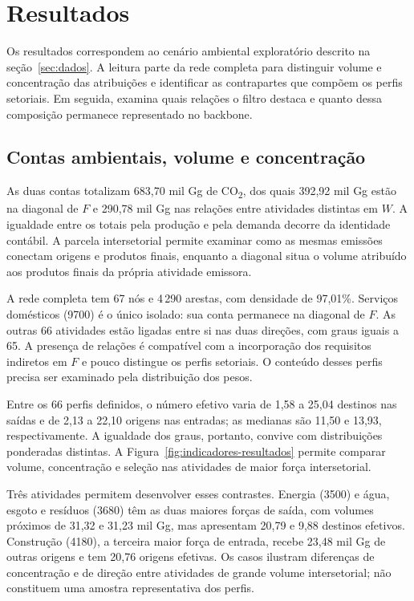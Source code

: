 \section{Resultados}
\label{sec:resultados}

Os resultados correspondem ao cenário ambiental exploratório descrito na seção~\ref{sec:dados}. A leitura parte da rede completa para distinguir volume e concentração das atribuições e identificar as contrapartes que compõem os perfis setoriais. Em seguida, examina quais relações o filtro destaca e quanto dessa composição permanece representado no backbone.

\subsection{Contas ambientais, volume e concentração}

As duas contas totalizam 683,70 mil Gg de CO\textsubscript{2}, dos quais 392,92 mil Gg estão na diagonal de $F$ e 290,78 mil Gg nas relações entre atividades distintas em $W$. A igualdade entre os totais pela produção e pela demanda decorre da identidade contábil. A parcela intersetorial permite examinar como as mesmas emissões conectam origens e produtos finais, enquanto a diagonal situa o volume atribuído aos produtos finais da própria atividade emissora.

A rede completa tem 67 nós e 4\,290 arestas, com densidade de 97,01\%. Serviços domésticos (9700) é o único isolado: sua conta permanece na diagonal de $F$. As outras 66 atividades estão ligadas entre si nas duas direções, com graus iguais a 65. A presença de relações é compatível com a incorporação dos requisitos indiretos em $F$ e pouco distingue os perfis setoriais. O conteúdo desses perfis precisa ser examinado pela distribuição dos pesos.

Entre os 66 perfis definidos, o número efetivo varia de 1,58 a 25,04 destinos nas saídas e de 2,13 a 22,10 origens nas entradas; as medianas são 11,50 e 13,93, respectivamente. A igualdade dos graus, portanto, convive com distribuições ponderadas distintas. A Figura~\ref{fig:indicadores-resultados} permite comparar volume, concentração e seleção nas atividades de maior força intersetorial.

Três atividades permitem desenvolver esses contrastes. Energia (3500) e água, esgoto e resíduos (3680) têm as duas maiores forças de saída, com volumes próximos de 31,32 e 31,23 mil Gg, mas apresentam 20,79 e 9,88 destinos efetivos. Construção (4180), a terceira maior força de entrada, recebe 23,48 mil Gg de outras origens e tem 20,76 origens efetivas. Os casos ilustram diferenças de concentração e de direção entre atividades de grande volume intersetorial; não constituem uma amostra representativa dos perfis.

